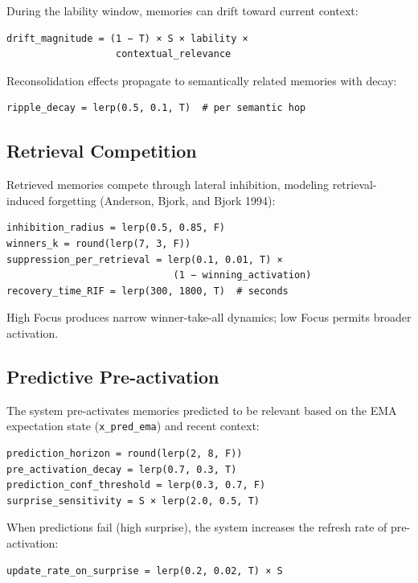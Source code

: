 \documentclass[
  letterpaper,
  DIV=11,
  numbers=noendperiod]{scrartcl}
\begin{document}
During the lability window, memories can drift toward current context:

\begin{verbatim}
drift_magnitude = (1 − T) × S × lability ×
                   contextual_relevance
\end{verbatim}

Reconsolidation effects propagate to semantically related memories with
decay:

\begin{verbatim}
ripple_decay = lerp(0.5, 0.1, T)  # per semantic hop
\end{verbatim}

\subsection{Retrieval Competition}\label{retrieval-competition}

Retrieved memories compete through lateral inhibition, modeling
retrieval-induced forgetting (Anderson, Bjork, and Bjork 1994):

\begin{verbatim}
inhibition_radius = lerp(0.5, 0.85, F)
winners_k = round(lerp(7, 3, F))
suppression_per_retrieval = lerp(0.1, 0.01, T) ×
                             (1 − winning_activation)
recovery_time_RIF = lerp(300, 1800, T)  # seconds
\end{verbatim}

High Focus produces narrow winner-take-all dynamics; low Focus permits
broader activation.

\subsection{Predictive Pre-activation}\label{predictive-pre-activation}

The system pre-activates memories predicted to be relevant based on the
EMA expectation state (\texttt{x\_pred\_ema}) and recent context:

\begin{verbatim}
prediction_horizon = round(lerp(2, 8, F))
pre_activation_decay = lerp(0.7, 0.3, T)
prediction_conf_threshold = lerp(0.3, 0.7, F)
surprise_sensitivity = S × lerp(2.0, 0.5, T)
\end{verbatim}

When predictions fail (high surprise), the system increases the refresh
rate of pre-activation:

\begin{verbatim}
update_rate_on_surprise = lerp(0.2, 0.02, T) × S
\end{verbatim}
\end{document}

